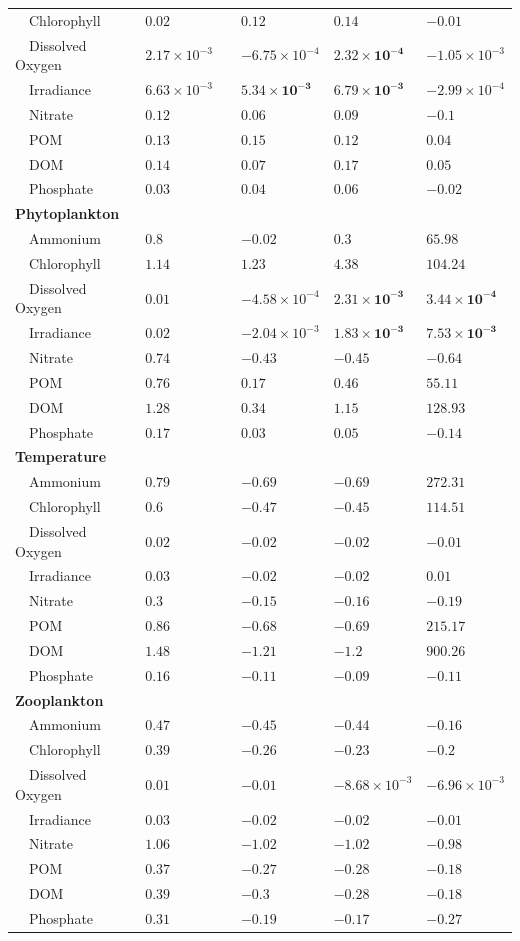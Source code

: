 \documentclass[letterpaper,12pt,oneside]{article}\usepackage[]{graphicx}\usepackage[]{color}
\begin{document}
\begin{table}[!tbp]
{\begin{center}
\begin{tabular}{llclll}
~~Chlorophyll&$0.02$&&$\bm{0.12}$&$\bm{0.14}$&$-0.01$\tabularnewline
~~Dissolved Oxygen&$2.17\times 10^{-3}$&&$-6.75\times 10^{-4}$&$\bm{2.32\times 10^{-4}}$&$-1.05\times 10^{-3}$\tabularnewline
~~Irradiance&$6.63\times 10^{-3}$&&$\bm{5.34\times 10^{-3}}$&$\bm{6.79\times 10^{-3}}$&$-2.99\times 10^{-4}$\tabularnewline
~~Nitrate&$0.12$&&$\bm{0.06}$&$\bm{0.09}$&$-0.1$\tabularnewline
~~POM&$0.13$&&$\bm{0.15}$&$\bm{0.12}$&$\bm{0.04}$\tabularnewline
~~DOM&$0.14$&&$\bm{0.07}$&$\bm{0.17}$&$\bm{0.05}$\tabularnewline
~~Phosphate&$0.03$&&$\bm{0.04}$&$\bm{0.06}$&$-0.02$\tabularnewline
\hline
{\bfseries Phytoplankton}&&&&&\tabularnewline
~~Ammonium&$0.8$&&$-0.02$&$\bm{0.3}$&$\bm{65.98}$\tabularnewline
~~Chlorophyll&$1.14$&&$\bm{1.23}$&$\bm{4.38}$&$\bm{104.24}$\tabularnewline
~~Dissolved Oxygen&$0.01$&&$-4.58\times 10^{-4}$&$\bm{2.31\times 10^{-3}}$&$\bm{3.44\times 10^{-4}}$\tabularnewline
~~Irradiance&$0.02$&&$-2.04\times 10^{-3}$&$\bm{1.83\times 10^{-3}}$&$\bm{7.53\times 10^{-3}}$\tabularnewline
~~Nitrate&$0.74$&&$-0.43$&$-0.45$&$-0.64$\tabularnewline
~~POM&$0.76$&&$\bm{0.17}$&$\bm{0.46}$&$\bm{55.11}$\tabularnewline
~~DOM&$1.28$&&$\bm{0.34}$&$\bm{1.15}$&$\bm{128.93}$\tabularnewline
~~Phosphate&$0.17$&&$\bm{0.03}$&$\bm{0.05}$&$-0.14$\tabularnewline
\hline
{\bfseries Temperature}&&&&&\tabularnewline
~~Ammonium&$0.79$&&$-0.69$&$-0.69$&$\bm{272.31}$\tabularnewline
~~Chlorophyll&$0.6$&&$-0.47$&$-0.45$&$\bm{114.51}$\tabularnewline
~~Dissolved Oxygen&$0.02$&&$-0.02$&$-0.02$&$-0.01$\tabularnewline
~~Irradiance&$0.03$&&$-0.02$&$-0.02$&$\bm{0.01}$\tabularnewline
~~Nitrate&$0.3$&&$-0.15$&$-0.16$&$-0.19$\tabularnewline
~~POM&$0.86$&&$-0.68$&$-0.69$&$\bm{215.17}$\tabularnewline
~~DOM&$1.48$&&$-1.21$&$-1.2$&$\bm{900.26}$\tabularnewline
~~Phosphate&$0.16$&&$-0.11$&$-0.09$&$-0.11$\tabularnewline
\hline
{\bfseries Zooplankton}&&&&&\tabularnewline
~~Ammonium&$0.47$&&$-0.45$&$-0.44$&$-0.16$\tabularnewline
~~Chlorophyll&$0.39$&&$-0.26$&$-0.23$&$-0.2$\tabularnewline
~~Dissolved Oxygen&$0.01$&&$-0.01$&$-8.68\times 10^{-3}$&$-6.96\times 10^{-3}$\tabularnewline
~~Irradiance&$0.03$&&$-0.02$&$-0.02$&$-0.01$\tabularnewline
~~Nitrate&$1.06$&&$-1.02$&$-1.02$&$-0.98$\tabularnewline
~~POM&$0.37$&&$-0.27$&$-0.28$&$-0.18$\tabularnewline
~~DOM&$0.39$&&$-0.3$&$-0.28$&$-0.18$\tabularnewline
~~Phosphate&$0.31$&&$-0.19$&$-0.17$&$-0.27$\tabularnewline
\hline
\end{tabular}\end{center}}

\end{table}


\clearpage
\end{document}
